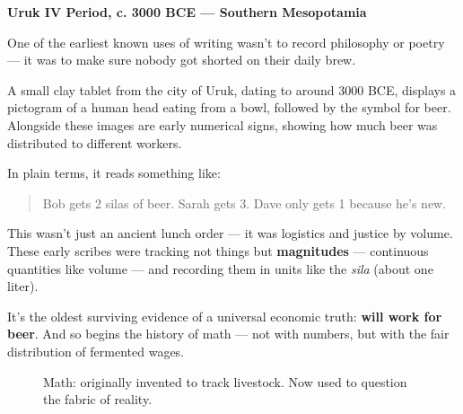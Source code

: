 \begin{tcolorbox}[title=Historical Sidebar: \textit{Will Work for Beer}, colback=gray!5, colframe=black, fonttitle=\bfseries]

  \textbf{Uruk IV Period, c. 3000 BCE — Southern Mesopotamia}
  
  One of the earliest known uses of writing wasn’t to record philosophy or poetry — it was to make sure nobody got shorted on their daily brew.
  
  A small clay tablet from the city of Uruk, dating to around 3000 BCE, displays a pictogram of a human head eating from a bowl, followed by the symbol for beer. Alongside these images are early numerical signs, showing how much beer was distributed to different workers.
  
  \medskip
  
  In plain terms, it reads something like:
  
  \begin{quote}
  Bob gets 2 silas of beer. Sarah gets 3. Dave only gets 1 because he’s new.
  \end{quote}
  
  \medskip
  
  This wasn’t just an ancient lunch order — it was logistics and justice by volume. These early scribes were tracking not things but \textbf{magnitudes} — continuous quantities like volume — and recording them in units like the \textit{sila} (about one liter).
  
  \medskip
  
  It’s the oldest surviving evidence of a universal economic truth: \textbf{will work for beer}. And so begins the history of math — not with numbers, but with the fair distribution of fermented wages.
  
\end{tcolorbox}
  



\begin{figure}[H]
\centering
{}
\caption{Math: originally invented to track livestock. Now used to question the fabric of reality.}
\end{figure}